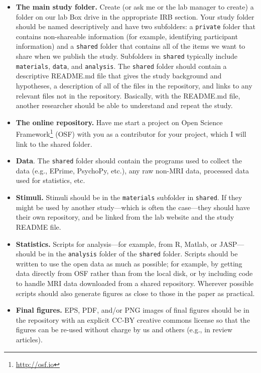 \documentclass[letterpaper,12pt,oneside]{memoir}
\begin{document}
\begin{itemize}

\item \textbf{The main study folder.} Create (or ask me or the lab manager to create) a folder on our lab Box drive in the appropriate IRB section. Your study folder should be named descriptively and have two subfolders: a \texttt{private} folder that contains non-shareable information (for example, identifying participant information) and a \texttt{shared} folder that contains all of the items we want to share when we publish the study. Subfolders in \texttt{shared} typically include \texttt{materials}, \texttt{data}, and \texttt{analysis}.  The \texttt{shared} folder should contain a descriptive README.md file that gives the study background and hypotheses, a description of all of the files in the repository, and links to any relevant files not in the repository. Basically, with the README.md file, another researcher should be able to understand and repeat the study.


\item \textbf{The online repository.} Have me start a project on Open Science Framework\footnote{\url{http://osf.io}} (OSF) with you as a contributor for your project, which I will link to the shared folder.

\item \textbf{Data}. The \texttt{shared} folder should contain the programs used to collect the data (e.g., EPrime, PsychoPy, etc.), any raw non-MRI data, processed data used for statistics, etc.

\item \textbf{Stimuli.} Stimuli should be in the \texttt{materials} subfolder in \texttt{shared}. If they might be used by another study---which is often the case---they should have their own repository, and be linked from the lab website and the study README file.

\item \textbf{Statistics.} Scripts for analysis---for example, from R, Matlab, or JASP---should be in the \texttt{analysis} folder of the \texttt{shared} folder. Scripts should be written to use the open data as much as possible; for example, by getting data directly from OSF rather than from the local disk, or by including code to handle MRI data downloaded from a shared repository. Wherever possible scripts should also generate figures as close to those in the paper as practical.

\item \textbf{Final figures.} EPS, PDF, and/or PNG images of final figures should be in the repository with an explicit CC-BY creative commons license so that the figures can be re-used without charge by us and others (e.g., in review articles).

\end{itemize}
\end{document}
